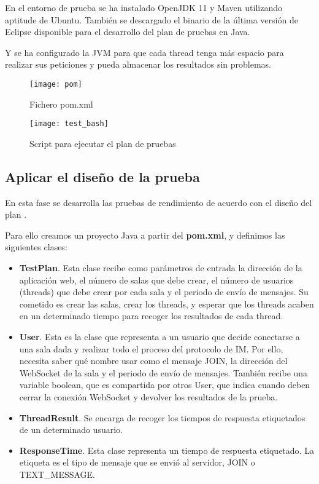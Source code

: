 En el entorno de prueba se ha instalado OpenJDK 11 y Maven utilizando aptitude de Ubuntu. También se descargado el binario de la última versión de Eclipse disponible para el desarrollo del plan de pruebas en Java.

Y se ha configurado la JVM para que cada thread tenga más espacio para realizar sus peticiones y pueda almacenar los resultados sin problemas.

\begin{figure}[htp!]
  \centering
  \texttt{[image: pom]}
  \caption{Fichero pom.xml}
  \label{fig:pom}
\end{figure}

\begin{figure}[htp!]
  \centering
  \texttt{[image: test\_bash]}
  \caption{Script para ejecutar el plan de pruebas}
  \label{fig:test_bash}
\end{figure}

\subsection{Aplicar el diseño de la prueba}

En esta fase se desarrolla las pruebas de rendimiento de acuerdo con el diseño del plan \cite{jmeter6}.

Para ello creamos un proyecto Java a partir del \textbf{pom.xml}, y definimos las siguientes clases:

\begin{itemize}
  \item \textbf{TestPlan}. Esta clase recibe como parámetros de entrada la dirección de la aplicación web, el número de salas que debe crear, el número de usuarios (threads) que debe crear por cada sala y el periodo de envío de mensajes. Su cometido es crear las salas, crear los threads, y esperar que los threads acaben en un determinado tiempo para recoger los resultados de cada thread.
  \item \textbf{User}. Esta es la clase que representa a un usuario que decide conectarse a una sala dada y realizar todo el proceso del protocolo de IM. Por ello, necesita saber qué nombre usar como el mensaje JOIN, la dirección del WebSocket de la sala y el periodo de envío de mensajes. También recibe una variable boolean, que es compartida por otros User, que indica cuando deben cerrar la conexión WebSocket y devolver los resultados de la prueba.
  \item \textbf{ThreadResult}. Se encarga de recoger los tiempos de respuesta etiquetados de un determinado usuario.
  \item \textbf{ResponseTime}. Esta clase representa un tiempo de respuesta etiquetado. La etiqueta es el tipo de mensaje que se envió al servidor, JOIN o TEXT\_MESSAGE.
\end{itemize}

